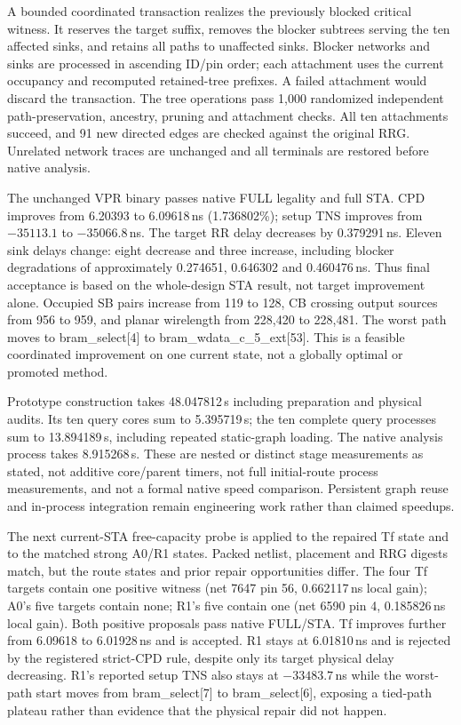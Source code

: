 A bounded coordinated transaction realizes the previously blocked critical witness. It reserves the target suffix, removes the blocker subtrees serving the ten affected sinks, and retains all paths to unaffected sinks. Blocker networks and sinks are processed in ascending ID/pin order; each attachment uses the current occupancy and recomputed retained-tree prefixes. A failed attachment would discard the transaction. The tree operations pass 1,000 randomized independent path-preservation, ancestry, pruning and attachment checks. All ten attachments succeed, and 91 new directed edges are checked against the original RRG. Unrelated network traces are unchanged and all terminals are restored before native analysis.

The unchanged VPR binary passes native FULL legality and full STA. CPD improves from 6.20393 to 6.09618\,ns (1.736802\%); setup TNS improves from $-35113.1$ to $-35066.8$\,ns. The target RR delay decreases by 0.379291\,ns. Eleven sink delays change: eight decrease and three increase, including blocker degradations of approximately 0.274651, 0.646302 and 0.460476\,ns. Thus final acceptance is based on the whole-design STA result, not target improvement alone. Occupied SB pairs increase from 119 to 128, CB crossing output sources from 956 to 959, and planar wirelength from 228,420 to 228,481. The worst path moves to bram\_select[4] to bram\_wdata\_c\_5\_ext[53]. This is a feasible coordinated improvement on one current state, not a globally optimal or promoted method.

Prototype construction takes 48.047812\,s including preparation and physical audits. Its ten query cores sum to 5.395719\,s; the ten complete query processes sum to 13.894189\,s, including repeated static-graph loading. The native analysis process takes 8.915268\,s. These are nested or distinct stage measurements as stated, not additive core/parent timers, not full initial-route process measurements, and not a formal native speed comparison. Persistent graph reuse and in-process integration remain engineering work rather than claimed speedups.

The next current-STA free-capacity probe is applied to the repaired Tf state and to the matched strong A0/R1 states. Packed netlist, placement and RRG digests match, but the route states and prior repair opportunities differ. The four Tf targets contain one positive witness (net 7647 pin 56, 0.662117\,ns local gain); A0's five targets contain none; R1's five contain one (net 6590 pin 4, 0.185826\,ns local gain). Both positive proposals pass native FULL/STA. Tf improves further from 6.09618 to 6.01928\,ns and is accepted. R1 stays at 6.01810\,ns and is rejected by the registered strict-CPD rule, despite only its target physical delay decreasing. R1's reported setup TNS also stays at $-33483.7$\,ns while the worst-path start moves from bram\_select[7] to bram\_select[6], exposing a tied-path plateau rather than evidence that the physical repair did not happen.

